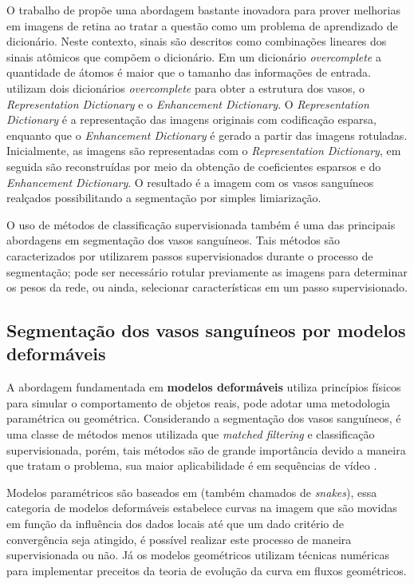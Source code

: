 O trabalho de  propõe uma abordagem  bastante inovadora para prover melhorias em imagens de retina ao tratar a questão como um problema de aprendizado de dicionário. Neste contexto, sinais são descritos como combinações lineares dos sinais atômicos que compõem o dicionário. Em um dicionário \textit{overcomplete}  a quantidade de átomos é maior que o tamanho das informações de entrada.  utilizam dois dicionários \textit{overcomplete} para obter a estrutura dos vasos, o \textit{Representation Dictionary} e o \textit{Enhancement Dictionary}. O \textit{Representation Dictionary} é a representação das imagens originais com codificação esparsa, enquanto que o \textit{Enhancement Dictionary} é gerado a partir das imagens rotuladas. Inicialmente, as imagens são representadas com o \textit{Representation Dictionary}, em seguida são reconstruídas por meio da obtenção de coeficientes esparsos e do \textit{Enhancement Dictionary}. O resultado é a  imagem com os vasos sanguíneos realçados possibilitando a segmentação por simples limiarização.

O uso de métodos de classificação supervisionada também é uma das principais abordagens em segmentação dos vasos sanguíneos. Tais métodos são caracterizados por utilizarem passos supervisionados durante o processo de segmentação; pode ser necessário rotular previamente as imagens para determinar os pesos da rede, ou ainda, selecionar características em um passo supervisionado. 

\subsection{Segmentação dos vasos sanguíneos por modelos deformáveis}

A abordagem fundamentada em \textbf{modelos deformáveis} utiliza princípios físicos para simular o comportamento de objetos reais, pode adotar uma metodologia paramétrica ou geométrica. Considerando a segmentação dos vasos sanguíneos, é uma classe de métodos menos utilizada que \textit{matched filtering} e classificação supervisionada, porém, tais métodos são de grande importância devido a maneira que tratam o problema, sua maior aplicabilidade é em sequências de vídeo \cite{Nubia}. 

Modelos paramétricos são baseados em  (também chamados de \textit{snakes}), essa categoria de modelos deformáveis estabelece curvas na imagem que são movidas em função da influência dos dados locais até que um dado critério de convergência seja atingido, é possível realizar este processo de maneira supervisionada ou não. Já os modelos geométricos utilizam técnicas numéricas para implementar preceitos da teoria de evolução da curva em fluxos geométricos. 

